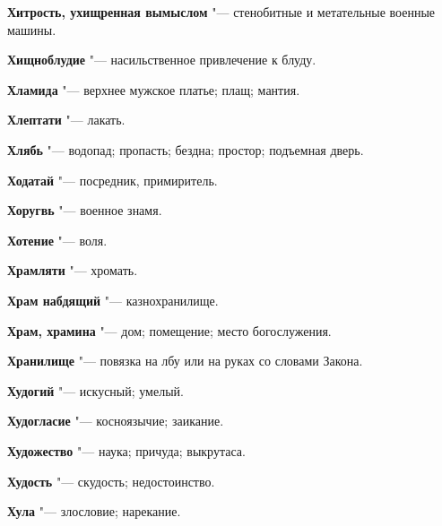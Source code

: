 \begin{mymulticols}{2}
\noindent\textbf{Хитрость, ухищренная вымыслом} "--- стенобитные и метательные военные машины. 




\noindent\textbf{Хищноблудие} "--- насильственное привлечение к блуду. 




\noindent\textbf{Хламида} "--- верхнее мужское платье; плащ; мантия. 




\noindent\textbf{Хлептати} "--- лакать. 




\noindent\textbf{Хлябь} "--- водопад; пропасть; бездна; простор; подъемная дверь. 




\noindent\textbf{Ходатай} "--- посредник, примиритель. 




\noindent\textbf{Хоругвь} "--- военное знамя. 




\noindent\textbf{Хотение} "--- воля. 




\noindent\textbf{Храмляти} "--- хромать. 




\noindent\textbf{Храм набдящий} "--- казнохранилище. 




\noindent\textbf{Храм, храмина} "--- дом; помещение; место богослужения. 




\noindent\textbf{Хранилище} "--- повязка на лбу или на руках со словами Закона. 




\noindent\textbf{Худогий} "--- искусный; умелый. 




\noindent\textbf{Худогласие} "--- косноязычие; заикание. 




\noindent\textbf{Художество} "--- наука; причуда; выкрутаса. 




\noindent\textbf{Худость} "--- скудость; недостоинство. 




\noindent\textbf{Хула} "--- злословие; нарекание. 




\bukvaending







\end{mymulticols}
